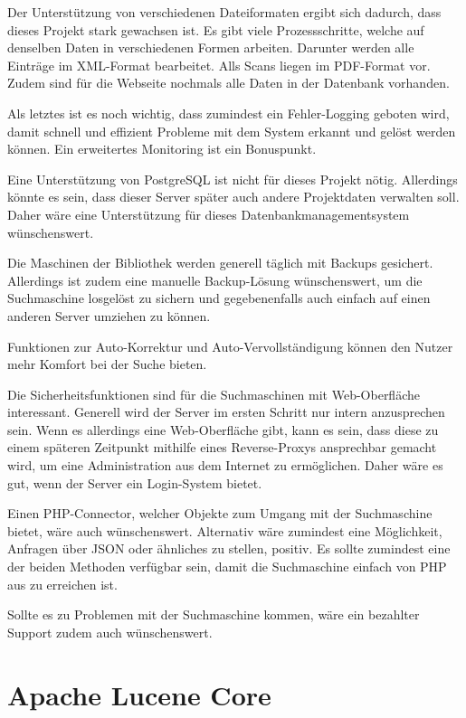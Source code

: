 Der Unterstützung von verschiedenen Dateiformaten ergibt sich dadurch, dass dieses Projekt stark gewachsen ist. Es gibt viele Prozessschritte, welche auf denselben Daten in verschiedenen Formen arbeiten. Darunter werden alle Einträge im XML-Format bearbeitet. Alls Scans liegen im PDF-Format vor. Zudem sind für die Webseite nochmals alle Daten in der Datenbank vorhanden.

Als letztes ist es noch wichtig, dass zumindest ein Fehler-Logging geboten wird, damit schnell und effizient Probleme mit dem System erkannt und gelöst werden können. Ein erweitertes Monitoring ist ein Bonuspunkt.

Eine Unterstützung von PostgreSQL ist nicht für dieses Projekt nötig. Allerdings könnte es sein, dass dieser Server später auch andere Projektdaten verwalten soll. Daher wäre eine Unterstützung für dieses Datenbankmanagementsystem wünschenswert.

Die Maschinen der Bibliothek werden generell täglich mit Backups gesichert. Allerdings ist zudem eine manuelle Backup-Lösung wünschenswert, um die Suchmaschine losgelöst zu sichern und gegebenenfalls auch einfach auf einen anderen Server umziehen zu können. 

Funktionen zur Auto-Korrektur und Auto-Vervollständigung können den Nutzer mehr Komfort bei der Suche bieten.

Die Sicherheitsfunktionen sind für die Suchmaschinen mit Web-Oberfläche interessant. Generell wird der Server im ersten Schritt nur intern anzusprechen sein. Wenn es allerdings eine Web-Oberfläche gibt, kann es sein, dass diese zu einem späteren Zeitpunkt mithilfe eines Reverse-Proxys ansprechbar gemacht wird, um eine Administration aus dem Internet zu ermöglichen. Daher wäre es gut, wenn der Server ein Login-System bietet.

Einen PHP-Connector, welcher Objekte zum Umgang mit der Suchmaschine bietet, wäre auch wünschenswert. Alternativ wäre zumindest eine Möglichkeit, Anfragen über JSON oder ähnliches zu stellen, positiv. Es sollte zumindest eine der beiden Methoden verfügbar sein, damit die Suchmaschine einfach von PHP aus zu erreichen ist.

Sollte es zu Problemen mit der Suchmaschine kommen, wäre ein bezahlter Support zudem auch wünschenswert.

\section{Apache Lucene Core}
\label{lucenecore}

